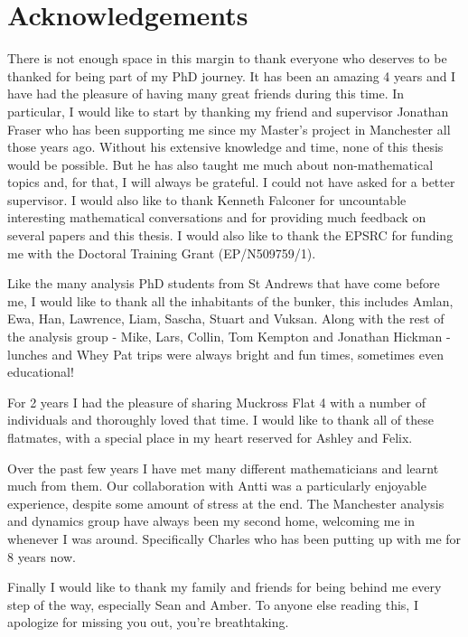 \chapter*{Acknowledgements}

There is not enough space in this margin to thank everyone who deserves to be thanked for being part of my PhD journey. It has been an amazing 4 years and I have had the pleasure of having many great friends during this time. In particular, I would like to start by thanking my friend and supervisor Jonathan Fraser who has been supporting me since my Master's project in Manchester all those years ago. Without his extensive knowledge and time, none of this thesis would be possible. But he has also taught me much about non-mathematical topics and, for that, I will always be grateful. I could not have asked for a better supervisor. I would also like to thank Kenneth Falconer for uncountable interesting mathematical conversations and for providing much feedback on several papers and this thesis. I would also like to thank the EPSRC for funding me with the Doctoral Training Grant
(EP/N509759/1).

Like the many analysis PhD students from St Andrews that have come before me, I would like to thank all the inhabitants of the bunker, this includes Amlan, Ewa, Han, Lawrence, Liam, Sascha, Stuart and Vuksan. Along with the rest of the analysis group - Mike, Lars, Collin, Tom Kempton and Jonathan Hickman - lunches and Whey Pat trips were always bright and fun times, sometimes even educational!

For 2 years I had the pleasure of sharing Muckross Flat 4 with a number of individuals and thoroughly loved that time. I would like to thank all of these flatmates, with a special place in my heart reserved for Ashley and Felix. 

Over the past few years I have met many different mathematicians and learnt much from them. Our collaboration with Antti was a particularly enjoyable experience, despite some amount of stress at the end. The Manchester analysis and dynamics group have always been my second home, welcoming me in whenever I was around. Specifically Charles who has been putting up with me for 8 years now.

Finally I would like to thank my family and friends for being behind me every step of the way, especially Sean and Amber. To anyone else reading this, I apologize for missing you out, you're breathtaking.


